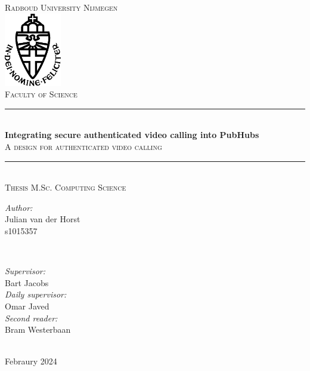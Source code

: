 \documentclass{report}
\title{\thesistitle}
\author{\thesisauthorfirst\space\thesisauthorsecond}
\date{\thesisdate}
\newcommand{\thesistitle}{Integrating secure authenticated video calling into PubHubs}
\newcommand{\thesissubtitle}{A design for authenticated video calling}
\newcommand\thesisauthorfirst{Julian van der Horst \\ s1015357}
\newcommand\thesisauthorsecond{\null}
\newcommand\thesissupervisorfirst{Bart Jacobs}
\newcommand\thesissupervisorsecond{Omar Javed}
\newcommand\thesissecondreadersecond{Bram Westerbaan}
\newcommand\thesisdate{Febraury 2024}
\begin{document}
\begin{titlepage}
\thispagestyle{empty}
\newcommand{\HRule}{\rule{\linewidth}{0.5mm}}
\center
\textsc{\Large Radboud University Nijmegen}\\[.7cm]
\includegraphics[width=25mm]{img/in_dei_nomine_feliciter}\\[.5cm]
\textsc{Faculty of Science}\\[0.5cm]

\HRule \\[0.4cm]
{ \huge \bfseries \thesistitle}\\[0.1cm]
\textsc{\thesissubtitle}\\
\HRule \\[.5cm]
\textsc{\large Thesis M.Sc. Computing Science}\\[.5cm]

\begin{minipage}{0.4\textwidth}
    \begin{flushleft}
        \large
        \emph{Author:}\\
        \thesisauthorfirst\space \textsc{\thesisauthorsecond}
    \end{flushleft}
\end{minipage}
~
\begin{minipage}{0.4\textwidth}
    \begin{flushright}
        \large
        \emph{Supervisor:} \\
        \thesissupervisorfirst  \\[1em]
        \emph{Daily supervisor:} \\
        \thesissupervisorsecond \\[1em]
        \emph{Second reader:} \\
        \thesissecondreadersecond \\[1em]
    \end{flushright}
\end{minipage}\\[4cm]
\vfill
{\large \thesisdate}
\end{titlepage}
\newpage
\end{document}

